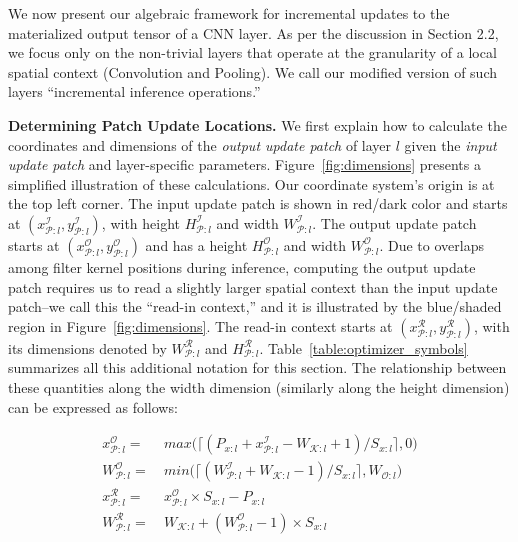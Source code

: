 We now present our algebraic framework for incremental updates to the materialized output tensor of a CNN layer. As per the discussion in Section 2.2, we focus only on the non-trivial layers that operate at the granularity of a local spatial context (Convolution and Pooling). We call our modified version of such layers ``incremental inference operations.''

\vspace{2mm}
\noindent \textbf{Determining Patch Update Locations.} We first explain how to calculate the coordinates and dimensions of the \textit{output update patch} of layer $l$ given the \textit{input update patch} and layer-specific parameters. Figure~\ref{fig:dimensions} presents a simplified illustration of these calculations. Our coordinate system's origin is at the top left corner. The input update patch is shown in red/dark color and starts at $(x^\mathcal{I}_{\mathcal{P}:l}, y^\mathcal{I}_{\mathcal{P}:l})$, with height $H^\mathcal{I}_{\mathcal{P}:l}$ and width $W^\mathcal{I}_{\mathcal{P}:l}$. The output update patch starts at $(x^\mathcal{O}_{\mathcal{P}:l}, y^\mathcal{O}_{\mathcal{P}:l})$ and has a height $H^\mathcal{O}_{\mathcal{P}:l}$ and width $W^\mathcal{O}_{\mathcal{P}:l}$. Due to overlaps among filter kernel positions during inference, computing the output update patch requires us to read a slightly larger spatial context than the input update patch--we call this the ``read-in context,'' and it is illustrated by the blue/shaded region in Figure~\ref{fig:dimensions}. The read-in context starts at $(x^\mathcal{R}_{\mathcal{P}:l}, y^\mathcal{R}_{\mathcal{P}:l})$, with its dimensions denoted by $W^\mathcal{R}_{\mathcal{P}:l}$ and $H^\mathcal{R}_{\mathcal{P}:l}$. Table~\ref{table:optimizer_symbols} summarizes all this additional notation for this section. The relationship between these quantities along the width dimension (similarly along the height dimension) can be expressed as follows:

\vspace{-3mm}
\begin{align}
\label{eqn:xcoordinate}
x^\mathcal{O}_{\mathcal{P}:l} =&~ max\big(\lceil (P_{x:l} + x^\mathcal{I}_{\mathcal{P}:l} - W_{\mathcal{K}:l} + 1)/S_{x:l} \rceil, 0\big)\\
\label{eqn:patchwidth}
W^\mathcal{O}_{\mathcal{P}:l} =&~ min\big(\lceil (W^\mathcal{I}_{\mathcal{P}:l} + W_{\mathcal{K}:l} - 1)/ S_{x:l} \rceil, W_{\mathcal{O}:l}\big)\\
\label{eqn:xreadcoordinate}
x^\mathcal{R}_{\mathcal{P}:l} =&~ x^\mathcal{O}_{\mathcal{P}:l} \times S_{x:l} - P_{x:l}\\
\label{eqn:readpatchwidth}
W^\mathcal{R}_{\mathcal{P}:l} =&~ W_{\mathcal{K}:l} + (W^\mathcal{O}_{\mathcal{P}:l}-1) \times S_{x:l}
\end{align}
\vspace{-6mm}


